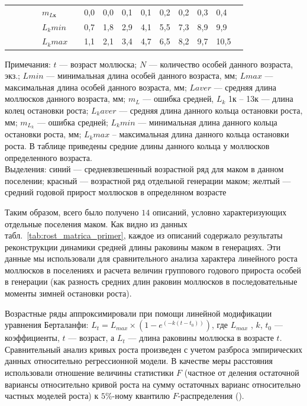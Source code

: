 \begin{table}[h]
\begin{tabularx}{\textwidth}{|X|X|XX|XX|XXXXXXXXX|}
                &    &       &       & $m_{Lк}$      &  & 0,0 & 0,0 & 0,1 & 0,1 & 0,2 & 0,2 & 0,3 & 0,4  &      \\
                &    &       &       & $L_{k} min$  &   & 0,7 & 1,8 & 2,9 & 4,1 & 5,5 & 7,3 & 8,9 & 9,9  &      \\
                &    &       &       &  $L_{k} max$ &   & 1,1 & 2,1 & 3,4 & 4,7 & 6,5 & 8,2 & 9,7 & 10,5 &     \\ \hline
    \end{tabularx}
    \footnotesize{Примечания: $t$ --- возраст моллюска; 
        $N$ --- количество  особей  данного возраста, экз.; 
        $L min$  ---  минимальная   длина  особей   данного   возраста,   мм;   
        $L max$   ---   максимальная   длина   особей   данного   возраста,   мм; 
        $L aver$ --- средняя длина моллюсков данного возраста, мм; 
        $m_L$ --- ошибка средней, 
        $L_k$ 1к -- 13к --- длина колец остановки роста;
        $L_k aver$ --- средняя длина данного кольца остановки роста, мм; 
        $m_{L_k}$ --- ошибка средней; 
        $L_k min$ --- минимальная длина данного кольца остановки роста, мм; 
        $L_k   max$   --   максимальная   длина   данного   кольца   остановки   роста.   
        В   таблице   приведены средние длины данного кольца у моллюсков определенного возраста. \\[1em]
    Выделения: синий --- средневзвешенный возрастной ряд для маком в данном поселении;
        красный --- возрастной ряд отдельной генерации маком;
        желтый --- средний годовой прирост моллюсков в определнном возрасте}
\end{table}
Таким образом, всего было получено $14$ описаний, условно характеризующих отдельные поселения маком. 
Как видно из данных табл.~\ref{tab:rost_matrica_primer}, каждое из описаний содержало результаты реконструкции динамики средней длины раковины маком в генерациях. 
Эти данные мы использовали для сравнительного анализа характера линейного роста моллюсков в поселениях и расчета величин группового годового прироста особей в генерации (как разность средних длин раковин моллюсков в последовательные моменты зимней остановки роста).

Возрастные ряды аппроксимировали при помощи линейной модификации уравнения Берталанфи: $L_{t} = L_{max} \times (1 - e^{(-k(t - t_{0}))})$, где $L_{max}$ , $k$, $t_{0}$ --- коэффициенты, $t$ --- возраст, а $L_{t}$ --- длина раковины моллюска в возрасте $t$.
Сравнительный анализ кривых роста произведен с учетом разброса эмпирических данных относительно регрессионной модели. 
В качестве меры расстояния использовали отношение величины статистики $F$ (частное от деления остаточной вариансы относительно кривой роста на сумму остаточных варианс относительно частных моделей роста) к $5$\%-ному квантилю $F$-распределения (\cite{Maximovich_1989}).

